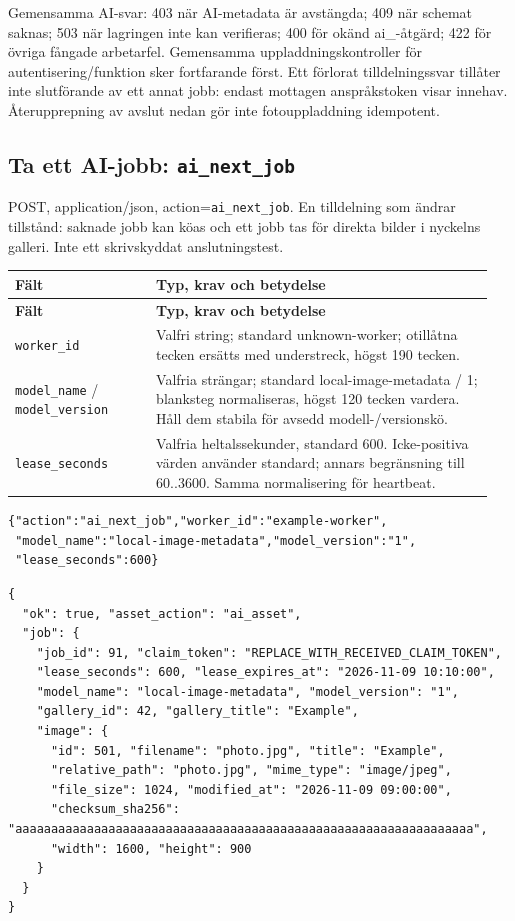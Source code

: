 \documentclass[11pt,a4paper]{article}
\newcommand{\codeword}[1]{\nolinkurl{#1}}
\begin{document}
Gemensamma AI-svar: 403 när AI-metadata är avstängda; 409 när schemat saknas; 503 när
lagringen inte kan verifieras; 400 för okänd ai\_-åtgärd; 422 för övriga fångade arbetarfel.
Gemensamma uppladdningskontroller för autentisering/funktion sker fortfarande först. Ett
förlorat tilldelningssvar tillåter inte slutförande av ett annat jobb: endast mottagen
anspråkstoken visar innehav. Återupprepning av avslut nedan gör inte fotouppladdning
idempotent.

\subsection{\texorpdfstring{Ta ett AI-jobb: \codeword{ai_next_job}}{Ta ett AI-jobb: ai\_next\_job}}

\label{api352:ai-next-job}

POST, application/json, action=\codeword{ai_next_job}. En tilldelning som ändrar tillstånd:
saknade jobb kan köas och ett jobb tas för direkta bilder i nyckelns galleri. Inte ett
skrivskyddat anslutningstest.

\begin{longtable}{@{}>{\RaggedRight\arraybackslash}p{0.28\linewidth}>{\RaggedRight\arraybackslash}p{0.67\linewidth}@{}}
\toprule
\textbf{Fält} & \textbf{Typ, krav och betydelse} \\
\midrule
\endfirsthead
\toprule
\textbf{Fält} & \textbf{Typ, krav och betydelse} \\
\midrule
\endhead
\bottomrule
\endfoot
\codeword{worker_id} & Valfri string; standard unknown-worker; otillåtna tecken ersätts med
understreck, högst 190 tecken. \\
\codeword{model_name} / \codeword{model_version} & Valfria strängar; standard
local-image-metadata / 1; blanksteg normaliseras, högst 120 tecken vardera. Håll dem stabila
för avsedd modell-/versionskö. \\
\codeword{lease_seconds} & Valfria heltalssekunder, standard 600. Icke-positiva värden
använder standard; annars begränsning till 60..3600. Samma normalisering för heartbeat. \\
\end{longtable}

\begin{lstlisting}[language={}]
{"action":"ai_next_job","worker_id":"example-worker",
 "model_name":"local-image-metadata","model_version":"1",
 "lease_seconds":600}
\end{lstlisting}

\begin{lstlisting}[language={}]
{
  "ok": true, "asset_action": "ai_asset",
  "job": {
    "job_id": 91, "claim_token": "REPLACE_WITH_RECEIVED_CLAIM_TOKEN",
    "lease_seconds": 600, "lease_expires_at": "2026-11-09 10:10:00",
    "model_name": "local-image-metadata", "model_version": "1",
    "gallery_id": 42, "gallery_title": "Example",
    "image": {
      "id": 501, "filename": "photo.jpg", "title": "Example",
      "relative_path": "photo.jpg", "mime_type": "image/jpeg",
      "file_size": 1024, "modified_at": "2026-11-09 09:00:00",
      "checksum_sha256": "aaaaaaaaaaaaaaaaaaaaaaaaaaaaaaaaaaaaaaaaaaaaaaaaaaaaaaaaaaaaaaaa",
      "width": 1600, "height": 900
    }
  }
}
\end{lstlisting}
\end{document}
